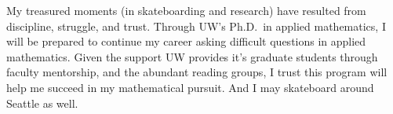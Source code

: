 \documentclass[11pt]{article}
\begin{document}
My treasured moments (in skateboarding and research) have resulted from discipline, struggle, and trust. Through UW's Ph.D.\ in applied mathematics, I will be prepared to continue my career asking difficult questions in applied mathematics. Given the support UW provides it's graduate students through faculty mentorship, and the abundant reading groups, I trust this program will help me succeed in my mathematical pursuit. And I may skateboard around Seattle as well.
\end{document}
